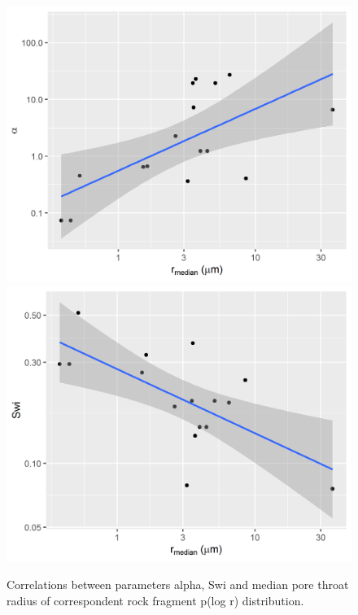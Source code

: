 \documentclass[english,msc,numbers]{coppe}
\begin{document}
  \begin{figure}
  
  {\centering \includegraphics[width=0.45\linewidth]{figure/2-12a-correlations-pchg} \includegraphics[width=0.45\linewidth]{figure/2-12b-correlations-pchg} 
  
  }
  
  \caption{Correlations between parameters alpha, Swi and median pore throat radius of correspondent rock fragment p(log r) distribution.}\label{fig:pcc-correlations2}
  \end{figure}
  \par
  
\end{document}

